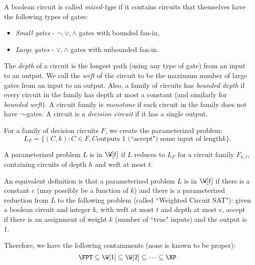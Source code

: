 \begin{definition}
A boolean circuit is called \emph{mixed-type} if it contains circuits that themselves have the following types of gates:
\begin{itemize}
\item \emph{Small gates} - $\neg, \vee, \wedge$ gates with bounded fan-in,
\item \emph{Large gates} - $\vee, \wedge$ gates with unbounded fan-in.
\end{itemize}
The \emph{depth} of a circuit is the longest path (using any type of gate) from an input to an output. We call the \emph{weft} of the circuit to be the maximum number of large gates from an input to an output. Also, a family of circuits has \emph{bounded depth} if every circuit in the family has depth at most a constant (and similarly for \emph{bounded weft}). A circuit family is \emph{monotone} if each circuit in the family does not have $\neg$-gates. A circuit is a \emph{decision circuit} if it has a single output.
\end{definition}

\begin{definition}
For a family of decision circuits $F$, we create the parameterized problem:
\[
L_F = \{(C, k) : C \in F, C \text{outputs 1 (``accept") some input of length} k\}.
\]
\end{definition}

\begin{definition}[$\W$ Hierarchy]
A parameterized problem $L$ is in $\W[t]$ if $L$ reduces to $L_F$ for a circuit family $F_{h, t}$, containing circuits of depth $h$ and weft at most $t$.

\par An equivalent definition is that a parameterized problem $L$ is in $\W[t]$ if there is a constant $c$ (may possibly be a function of $k$) and there is a parameterized reduction from $L$ to the following problem (called ``Weighted Circuit SAT"): given a boolean circuit and integer $k$, with weft at most $t$ and depth at most $c$, accept if there is an assignment of weight $k$ (number of ``true" inputs) and the output is 1.
\end{definition}

Therefore, we have the following containments (none is known to be proper):
\[
\FPT \subseteq \W[1] \subseteq \W[2] \subseteq \cdots \subseteq \XP
\]
